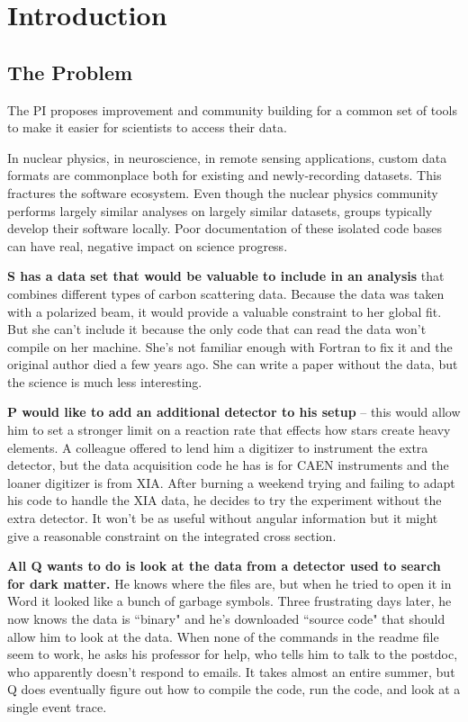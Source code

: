 
\section{Introduction}\label{sec:overview}

\subsection{The Problem}
The PI proposes improvement and community building for a common set of tools to make it easier for scientists to access their data.

In nuclear physics, in neuroscience, in remote sensing applications, custom data formats are commonplace both for existing and newly-recording datasets.  This fractures the software ecosystem.  Even though the nuclear physics community performs largely similar analyses on largely similar datasets, groups typically develop their software locally.  Poor documentation of these isolated code bases can have real, negative impact on science progress. 
 
\textbf{S has a data set that would be valuable to include in an analysis} that combines different types of carbon scattering data.  Because the data was taken with a polarized beam, it would provide a valuable constraint to her global fit.  But she can't include it because the only code that can read the data won’t compile on her machine.  She's not familiar enough with Fortran to fix it and the original author died a few years ago.  She can write a paper without the data, but the science is much less interesting. 
 
\textbf{P would like to add an additional detector to his setup} -- this would allow him to set a stronger limit on a reaction rate that effects how stars create heavy elements.  A colleague offered to lend him a digitizer to instrument the extra detector, but the data acquisition code he has is for CAEN instruments and the loaner digitizer is from XIA.  After burning a weekend trying and failing to adapt his code to handle the XIA data, he decides to try the experiment without the extra detector.  It won't be as useful without angular information but it might give a reasonable constraint on the integrated cross section.
 
\textbf{All Q wants to do is look at the data from a detector used to search for dark matter.}  He knows where the files are, but when he tried to open it in Word it looked like a bunch of garbage symbols.  Three frustrating days later, he now knows the data is ``binary" and he's downloaded ``source code"  
that should allow him to look at the data.  When none of the commands in the readme file seem to work, he asks his professor for help, who tells him to talk to the postdoc, who apparently doesn't respond to emails.  It takes almost an entire summer, but Q does eventually figure out how to compile the code, run the code, and look at a single event trace.   

